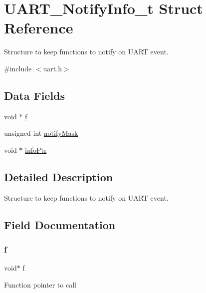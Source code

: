 \hypertarget{struct_u_a_r_t___notify_info__t}{}\section{U\+A\+R\+T\+\_\+\+Notify\+Info\+\_\+t Struct Reference}
\label{struct_u_a_r_t___notify_info__t}


Structure to keep functions to notify on U\+A\+RT event.  




{\ttfamily \#include $<$uart.\+h$>$}

\subsection*{Data Fields}
\begin{DoxyCompactItemize}
\item 
void $\ast$ \hyperlink{struct_u_a_r_t___notify_info__t_a4df90769279b65ef37fb25ad30e03c9a}{f}
\item 
unsigned int \hyperlink{struct_u_a_r_t___notify_info__t_ab1ba4c6292ebde426204d8c2b2ac9154}{notify\+Mask}
\item 
void $\ast$ \hyperlink{struct_u_a_r_t___notify_info__t_a75ec8ee0f337678253e996ec27840b2b}{info\+Ptr}
\end{DoxyCompactItemize}


\subsection{Detailed Description}
Structure to keep functions to notify on U\+A\+RT event. 

\subsection{Field Documentation}
\mbox{\label{struct_u_a_r_t___notify_info__t_a4df90769279b65ef37fb25ad30e03c9a}} 
\subsubsection{\texorpdfstring{f}{f}}
{\footnotesize\ttfamily void$\ast$ f}

Function pointer to call \mbox{\label{struct_u_a_r_t___notify_info__t_a75ec8ee0f337678253e996ec27840b2b}} 
